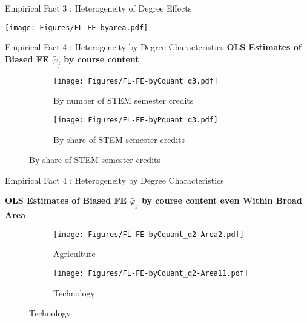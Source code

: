 \documentclass[table,10pt]{beamer}
\begin{document}


\begin{frame}{Empirical Fact 3 : Heterogeneity of Degree Effects   }
	\begin{center}
		\texttt{[image: Figures/FL-FE-byarea.pdf]}
	\end{center}
\end{frame}


\begin{frame}{Empirical Fact 4 : Heterogeneity by Degree Characteristics }
\textbf{OLS Estimates of Biased FE $\widetilde{\varphi_j}$ by course content}
\begin{center}
\begin{figure}[H]
\centering
\begin{subfigure}{0.5\textwidth}
\centering
    \texttt{[image: Figures/FL-FE-byCquant\_q3.pdf]}
    \caption{By number of STEM semester credits}
\end{subfigure}%
\begin{subfigure}{0.5\textwidth}
\centering
    \texttt{[image: Figures/FL-FE-byPquant\_q3.pdf]}
    \caption{By share of STEM semester credits}
\end{subfigure}
\end{figure}
\end{center}
\end{frame}

\begin{frame}{Empirical Fact 4 : Heterogeneity by Degree Characteristics }
\begin{center}
\textbf{OLS Estimates of Biased FE $\widetilde{\varphi_j}$ by course content even Within Broad Area}
\begin{figure}[H]
\centering
\begin{subfigure}{0.5\textwidth}
\centering
    \texttt{[image: Figures/FL-FE-byCquant\_q2-Area2.pdf]}
    \caption{Agriculture}
\end{subfigure}%
\begin{subfigure}{0.5\textwidth}
\centering
    \texttt{[image: Figures/FL-FE-byCquant\_q2-Area11.pdf]}
    \caption{Technology}
\end{subfigure}
\end{figure}
\end{center}
\end{frame}
\end{document}
